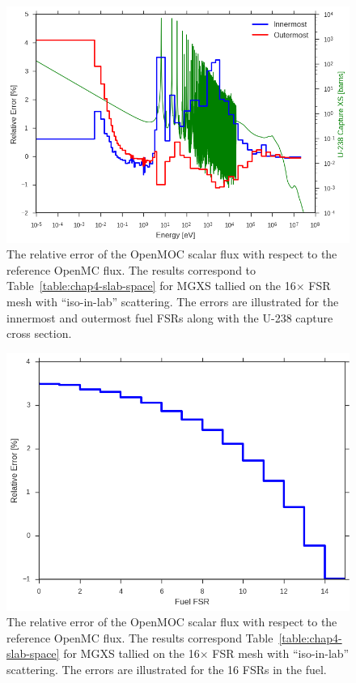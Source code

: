 \begin{figure}[H]
  \centering
  \includegraphics[width=0.85\linewidth]{figures/biases/slab/rel-err-inner-outer}
\caption[Flux relative error by group for a 1D slab.]{The relative error of the OpenMOC scalar flux with respect to the reference OpenMC flux. The results correspond to Table~\ref{table:chap4-slab-space} for \ac{MGXS} tallied on the 16$\times$ \ac{FSR} mesh with ``iso-in-lab'' scattering. The errors are illustrated for the innermost and outermost fuel \ac{FSR}s along with the U-238 capture cross section.}
\label{fig:chap4-slab-rel-err}
\end{figure}

\begin{figure}[H]
  \centering
  \includegraphics[width=0.8\linewidth]{figures/biases/slab/rel-err-fuel-fsrs}
\caption[Flux relative error by fuel FSR for a 1D slab.]{The relative error of the OpenMOC scalar flux with respect to the reference OpenMC flux. The results correspond Table~\ref{table:chap4-slab-space} for \ac{MGXS} tallied on the 16$\times$ \ac{FSR} mesh with ``iso-in-lab'' scattering. The errors are illustrated for the 16 \ac{FSR}s in the fuel.}
\label{fig:chap4-slab-fuel-fsrs}
\end{figure}

